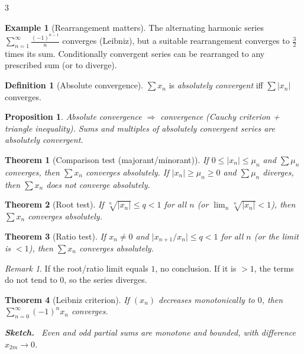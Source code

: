 \documentclass[10pt,a4paper,landscape]{article}
\theoremstyle{definition}
\newtheorem{defn}{Definition}[section]
\newtheorem{exm}{Example}[section]
\theoremstyle{plain}
\newtheorem{thm}{Theorem}[section]
\newtheorem{prop}{Proposition}[section]
\theoremstyle{remark}
\newtheorem{rem}{Remark}[section]
\newcommand{\abs}[1]{\lvert #1 \rvert}
\newcommand{\oo}{\infty}
\newenvironment{proofsketch}{%
  \par\small\color{exgray}\textbf{Sketch.}\ }%
  {\par}
\begin{document}
\begin{multicols*}{3}
\begin{exm}[Rearrangement matters]
The alternating harmonic series $\sum_{n=1}^{\oo} \frac{(-1)^{n-1}}{n}$ converges (Leibniz), but a suitable rearrangement converges to $\frac{3}{2}$ times its sum. Conditionally convergent series can be rearranged to any prescribed sum (or to diverge).
\end{exm}

\begin{defn}[Absolute convergence]
$\sum x_n$ is \emph{absolutely convergent} iff $\sum \abs{x_n}$ converges.
\end{defn}

\begin{prop}
Absolute convergence $\Rightarrow$ convergence (Cauchy criterion + triangle inequality). Sums and multiples of absolutely convergent series are absolutely convergent.
\end{prop}

\begin{thm}[Comparison test (majorant/minorant)]
If $0 \le \abs{x_n} \le \mu_n$ and $\sum \mu_n$ converges, then $\sum x_n$ converges absolutely. If $\abs{x_n} \ge \mu_n \ge 0$ and $\sum \mu_n$ diverges, then $\sum x_n$ does not converge absolutely.
\end{thm}

\begin{thm}[Root test]
If $\sqrt[n]{\abs{x_n}} \le q < 1$ for all $n$ (or $\lim_n \sqrt[n]{\abs{x_n}} < 1$), then $\sum x_n$ converges absolutely.
\end{thm}

\begin{thm}[Ratio test]
If $x_n \neq 0$ and $\abs{x_{n+1}/x_n} \le q < 1$ for all $n$ (or the limit is $<1$), then $\sum x_n$ converges absolutely.
\end{thm}

\begin{rem}
If the root/ratio limit equals $1$, no conclusion. If it is $>1$, the terms do not tend to $0$, so the series diverges.
\end{rem}

\begin{thm}[Leibniz criterion]
If $(x_n)$ decreases monotonically to $0$, then $\sum_{n=0}^{\oo} (-1)^n x_n$ converges.
\begin{proofsketch}
Even and odd partial sums are monotone and bounded, with difference $x_{2m} \to 0$.
\end{proofsketch}
\end{thm}


\end{multicols*}
\end{document}
